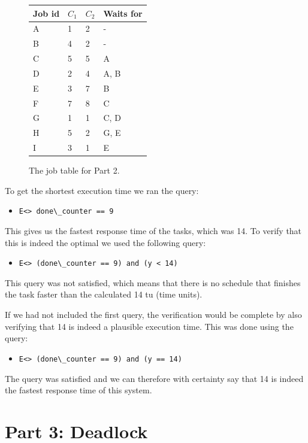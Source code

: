 \documentclass[a4paper,10pt]{article}
\newcommand{\query}[1]{\lstinline{#1}}
\begin{document}
\begin{figure}[h]
\center
\begin{tabular}{l | l | l | l}
  \hline
  Job id & $C_1$ & $C_2$ & Waits for \\
  \hline
  A & 1 & 2 & - \\
  B & 4 & 2 & - \\
  C & 5 & 5 & A \\
  D & 2 & 4 & A, B \\
  E & 3 & 7 & B \\
  F & 7 & 8 & C \\
  G & 1 & 1 & C, D \\
  H & 5 & 2 & G, E \\
  I & 3 & 1 & E \\
  \hline
\end{tabular}
\caption{The job table for Part 2.}
\label{tab:part2jobtable}
\end{figure}


To get the shortest execution time we ran the query:

\begin{itemize}
\item[]\query{E<> done\_counter == 9}
\end{itemize}

This gives us the fastest response time of the tasks, which was 14. To verify that this is indeed the optimal we used the following query:

\begin{itemize}
\item[] \query{E<> (done\_counter == 9) and (y < 14)}
\end{itemize}

This query was not satisfied, which means that there is no schedule that finishes the task faster than the calculated 14 tu (time units).

If we had not included the first query, the verification would be complete by also verifying that 14 is indeed a plausible execution time. This was done using the query:

\begin{itemize}
\item[] \query{E<> (done\_counter == 9) and (y == 14)}
\end{itemize}

The query was satisfied and we can therefore with certainty say that 14 is indeed the fastest response time of this system.


\section*{Part 3: Deadlock}
\end{document}
